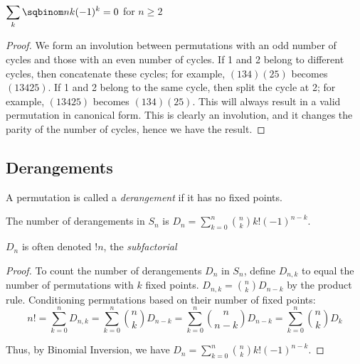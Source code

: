 \documentclass[a4paper]{article}
\begin{document}
\begin{proposition}
$\displaystyle\sum_{k}\sqbinom nk(-1)^k=0$ for $n\geq2$

\begin{hl}
\begin{proof}
We form an involution between permutations with an odd number of cycles and those with an even number of cycles. If 1 and 2 belong to different cycles, then concatenate these cycles; for example, $(134)(25)$ becomes $(13425)$. If 1 and 2 belong to the same cycle, then split the cycle at 2; for example, $(13425)$ becomes $(134)(25)$. This will always result in a valid permutation in canonical form. This is clearly an involution, and it changes the parity of the number of cycles, hence we have the result.
\end{proof}
\end{hl}
\end{proposition}

\subsection{Derangements}

\begin{definition}
A permutation is called a \emph{derangement} if it has no fixed points.
\end{definition}

\begin{theorem}\label{derangements}
The number of derangements in $S_n$ is $D_n=\sum_{k=0}^n\binom nkk!(-1)^{n-k}$.
\begin{arrows}
\item $D_n$ is often denoted $!n$, the \emph{subfactorial}
\end{arrows}

\begin{hl}
\begin{proof}
To count the number of derangements $D_n$ in $S_n$, define $D_{n,k}$ to equal the number of permutations with $k$ fixed points. $D_{n,k}=\binom nkD_{n-k}$ by the product rule. Conditioning permutations based on their number of fixed points:
\begin{equation*}
n!
=\sum_{k=0}^nD_{n,k}
=\sum_{k=0}^n\binom nkD_{n-k}
=\sum_{k=0}^n\binom n{n-k}D_{n-k}
=\sum_{k=0}^n\binom nkD_k
\end{equation*}

Thus, by Binomial Inversion, we have $D_n=\sum_{k=0}^n\binom nkk!(-1)^{n-k}$.
\end{proof}
\end{hl}
\end{theorem}
\end{document}
